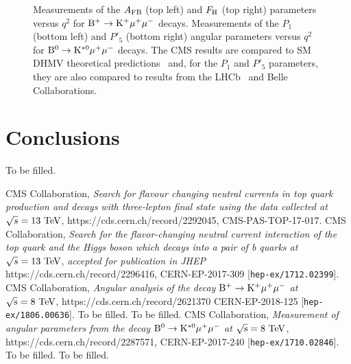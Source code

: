 \documentclass{PoS}
\begin{document}
\begin{figure}[htb]
\caption{
  Measurements of the $A_{\rm FB}$ (top left) and $F_{\rm H}$ (top right)
  parameters versus $q^2$ for ${\rm B^+ \to K^+\mu^+\mu^-}$ decays. Measurements of
  the $P_1$ (bottom left) and $P'_5$ (bottom right) angular parameters versus
  $q^2$ for ${\rm B^0 \to K^{*0}\mu^+\mu^-}$ decays. The CMS results are compared to
  SM  DHMV theoretical predictions~\cite{Descotes-Genon:2014uoa,Descotes-Genon:2015uva}
  and, for the $P_1$ and $P'_5$ parameters, they are also compared to results
  from the LHCb~\cite{LHCb} and Belle~\cite{Belle} Collaborations.
}
\label{fig:BPH-15-001_Figure_005__BPH-15-008_Figure003}
\end{figure}


\section{Conclusions}

To be filled.


\begin{thebibliography}{99}

  CMS Collaboration,
  \emph{Search for flavour changing neutral currents in top quark production and decays with three-lepton final state using the data collected at $\sqrt{s} = 13~{\rm TeV}$},
  https://cds.cern.ch/record/2292045, CMS-PAS-TOP-17-017.
  CMS Collaboration,
  \emph{Search for the flavor-changing neutral current interaction of the top quark and the Higgs boson which decays into a pair of b quarks at $\sqrt{s} = 13~{\rm TeV}$},
  \emph{accepted for publication in JHEP}
  https://cds.cern.ch/record/2296416, CERN-EP-2017-309
  [{\tt hep-ex/1712.02399}].
  CMS Collaboration,
  \emph{Angular analysis of the decay ${\rm B^+ \to K^+\mu^+\mu^-}$ at ${\rm \sqrt{s} = 8~TeV}$},
  https://cds.cern.ch/record/2621370 CERN-EP-2018-125
  [{\tt hep-ex/1806.00636}].
  To be filled.
  To be filled.
  CMS Collaboration,
  \emph{Measurement of angular parameters from the decay ${\rm B^0 \to K^{*0}\mu^+\mu^-}$ at ${\rm \sqrt{s} = 8~TeV}$},
  https://cds.cern.ch/record/2287571, CERN-EP-2017-240
  [{\tt hep-ex/1710.02846}].  
  To be filled.
  To be filled.
\end{thebibliography}
\end{document}

